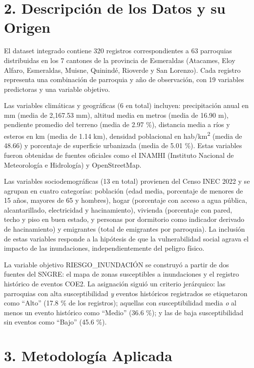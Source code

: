 \documentclass[12pt,a4paper]{article}
\begin{document}
\section{2. Descripción de los Datos y su Origen}

El dataset integrado contiene 320 registros correspondientes a 63 parroquias distribuidas en los 7 cantones de la provincia de Esmeraldas (Atacames, Eloy Alfaro, Esmeraldas, Muisne, Quinindé, Rioverde y San Lorenzo). Cada registro representa una combinación de parroquia y año de observación, con 19 variables predictoras y una variable objetivo.

Las variables climáticas y geográficas (6 en total) incluyen: precipitación anual en mm (media de 2,167.53 mm), altitud media en metros (media de 16.90 m), pendiente promedio del terreno (media de 2.97 \%), distancia media a ríos y esteros en km (media de 1.14 km), densidad poblacional en hab/km\textsuperscript{2} (media de 48.66) y porcentaje de superficie urbanizada (media de 5.01 \%). Estas variables fueron obtenidas de fuentes oficiales como el INAMHI (Instituto Nacional de Meteorología e Hidrología) y OpenStreetMap.

Las variables sociodemográficas (13 en total) provienen del Censo INEC 2022 y se agrupan en cuatro categorías: población (edad media, porcentaje de menores de 15 años, mayores de 65 y hombres), hogar (porcentaje con acceso a agua pública, alcantarillado, electricidad y hacinamiento), vivienda (porcentaje con pared, techo y piso en buen estado, y personas por dormitorio como indicador derivado de hacinamiento) y emigrantes (total de emigrantes por parroquia). La inclusión de estas variables responde a la hipótesis de que la vulnerabilidad social agrava el impacto de las inundaciones, independientemente del peligro físico.

La variable objetivo RIESGO\_INUNDACIÓN se construyó a partir de dos fuentes del SNGRE: el mapa de zonas susceptibles a inundaciones y el registro histórico de eventos COE2. La asignación siguió un criterio jerárquico: las parroquias con alta susceptibilidad \textit{y} eventos históricos registrados se etiquetaron como ``Alto'' (17.8 \% de los registros); aquellas con susceptibilidad media \textit{o} al menos un evento histórico como ``Medio'' (36.6 \%); y las de baja susceptibilidad sin eventos como ``Bajo'' (45.6 \%).

\section{3. Metodología Aplicada}
\end{document}
